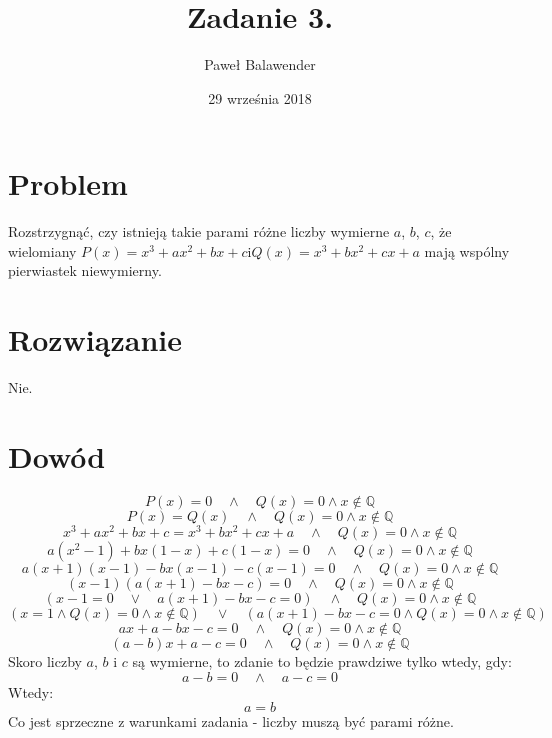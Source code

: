 \documentclass[11pt]{article}
\title{Zadanie 3.}
\date{29 września 2018}
\author{Paweł Balawender}
\begin{document}
\maketitle

\section*{Problem}
\begin{justify}
Rozstrzygnąć, czy istnieją takie parami różne liczby wymierne $a$, $b$, $c$, że wielomiany
$P(x) = x^3 + ax^2 + bx + c$\quad i\quad$Q(x) = x^3 + bx^2 + cx + a$
mają wspólny pierwiastek niewymierny.
\section*{Rozwiązanie}
Nie.
\section*{Dowód}
\begin{equation}P(x) = 0 \quad\land\quad Q(x) = 0 \land x \notin \mathbb{Q}\end{equation}
\begin{equation}P(x) = Q(x) \quad\land\quad Q(x) = 0 \land x \notin \mathbb{Q}\end{equation}
\begin{equation}x^3+ax^2+bx+c = x^3+bx^2+cx+a \quad\land\quad Q(x)=0 \land x \notin\mathbb{Q}\end{equation}
\begin{equation}a(x^2 - 1) + bx(1 - x) + c(1 - x) = 0 \quad\land\quad Q(x) = 0 \land x \notin \mathbb{Q}\end{equation}
\begin{equation}a(x+1)(x-1) - bx(x-1) - c(x-1) = 0 \quad\land\quad Q(x) = 0 \land x \notin \mathbb{Q}\end{equation}
\begin{equation}(x-1)(a(x+1) -bx -c) = 0 \quad\land\quad Q(x) = 0 \land x \notin \mathbb{Q}\end{equation}
\begin{equation}(x-1 = 0 \quad\lor\quad a(x+1)-bx-c = 0) \quad\land\quad Q(x) = 0 \land x \notin \mathbb{Q}\end{equation}
\begin{equation}(x = 1 \land Q(x) = 0 \land x \notin \mathbb{Q})\quad \lor\quad (a(x+1)-bx-c=0 \land Q(x) = 0 \land x \notin \mathbb{Q})\end{equation}
\begin{equation}ax+a-bx-c=0 \quad\land\quad Q(x) = 0 \land x \notin \mathbb{Q}\end{equation}
\begin{equation}(a-b)x + a - c = 0 \quad\land\quad Q(x) = 0 \land x \notin \mathbb{Q}\end{equation}
Skoro liczby $a$, $b$ i $c$ są wymierne, to zdanie to będzie prawdziwe tylko wtedy, gdy:
\begin{equation}a-b=0 \quad\land\quad a-c=0\end{equation}
Wtedy:
\begin{equation}a=b\end{equation}
Co jest sprzeczne z warunkami zadania - liczby muszą być parami różne.
\end{justify}
\end{document}
